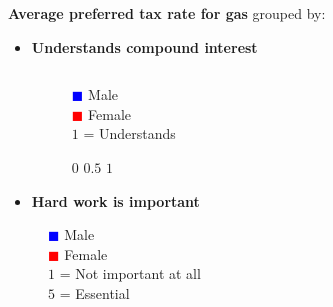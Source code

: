 \documentclass{beamer}              %
\begin{document}
\begin{frame}


 
         \textbf{Average preferred tax rate for \colorbox{babypink}{gas}} grouped by:
\begin{itemize}       
    \item    \textbf{\small Understands compound interest}

 
     \begin{figure}
      \begin{columns}
     
  \caption*{ \hspace{0.6cm} \textcolor{blue}{$\blacksquare$} Male\\ \hspace{0.6cm} \textcolor{red}{$\blacksquare$} Female
  \\ \vspace{0.2cm} \hspace{0.6cm} $1$ = Understands}

 \vspace{-0.3cm}   \caption*{\footnotesize \hspace{0.6cm}$0$ \hspace{1cm}$0.5$ \hspace{1cm}$1$ }
      \end{columns}
    \end{figure}
    
\vspace{-0.3cm}
    \item    \textbf{\small Hard work is important}
\end{itemize}

\vspace{-0.2cm}
    \begin{figure}
      \begin{columns}
        \vspace{-1.5cm}
  \caption*{ \hspace{0.8cm} \textcolor{blue}{$\blacksquare$} Male\\ \hspace{0.8cm} \textcolor{red}{$\blacksquare$} Female
  \\ \vspace{0.2cm} \hspace{0.8cm} $1$ = Not important at all  \\ \hspace{0.8cm} $5$ = Essential}
  \vspace{-1.5cm}        
        

\end{columns}
\end{figure}
\end{frame}
\end{document}

